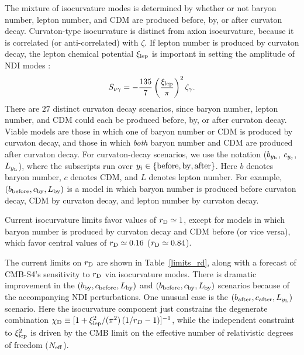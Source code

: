 The mixture of isocurvature modes is determined by whether or not baryon number, lepton number, and CDM are produced before, by, or after curvaton decay. Curvaton-type isocurvature is distinct from axion isocurvature, because it is correlated (or anti-correlated) with $\zeta$. If lepton number is produced by curvaton decay, the lepton chemical potential $\xi_{\rm lep}$ is important in setting the amplitude of NDI modes \cite{Lyth:2002my,Gordon:2003hw,DiValentino:2011sv}:
\begin{equation}
S_{\nu \gamma}=
-\frac{135}{7}\left(\frac{\xi_{\rm lep}}{\pi}\right)^2\zeta_{\gamma}.\end{equation}
There are $27$ distinct curvaton decay scenarios, since baryon number, lepton number, and CDM could each be produced before, by, or after curvaton decay. Viable models are those in which one of baryon number or CDM is produced by curvaton decay, and those in which \textit{both} baryon number and CDM are produced after curvaton decay. For curvaton-decay scenarios, we use the notation ($b_{y_{\rm b}}$, $c_{y_{\rm c}}$, $L_{y_{\rm L}}$), where the subscripts run over $y_i\in \{{\rm before, by, after}\}$. Here $b$ denotes baryon number, $c$ denotes CDM, and $L$ denotes lepton number. For example, $(b_{\rm before}, c_{\rm by}, L_{\rm by})$ is a model in which baryon number is produced before curvaton decay, CDM by curvaton decay, and lepton number by curvaton decay.

Current isocurvature limits favor values of $r_{\rm D}\simeq 1$, except for models in which baryon number is produced by curvaton decay and CDM before (or vice versa), which favor central values of $r_{\rm D} \simeq 0.16$ ($r_{\rm D} \simeq 0.84$). 

The current limits \cite{Smith:2015bln} on $r_{\rm D}$ are shown in Table~\ref{limits_rd}, along with a forecast of CMB-S4's sensitivity to $r_{\rm D}$ via isocurvature modes. There is dramatic improvement in the $(b_{\rm by},c_{\rm before},L_{\rm by})$ and $(b_{\rm before},c_{\rm by},L_{\rm by})$ scenarios because of the accompanying NDI perturbations. One unusual case is the $(b_{\rm after},c_{\rm after}, L_{y_{\rm L}})$ scenario. Here the isocurvature component just constrains the degenerate combination \cite{Smith:2015bln} $\chi_{\rm D} \equiv [1+\xi_{\rm lep}^2/(\pi^2) \left(1/r_D -1\right)]^{-1}$, while the independent constraint to $\xi_{\rm lep}^{2}$ is driven by the CMB limit on the effective number of relativistic degrees of freedom ($N_{\rm eff}$).


